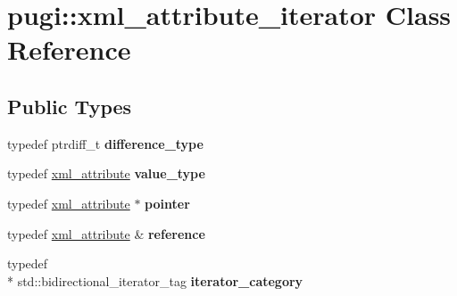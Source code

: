 \hypertarget{classpugi_1_1xml__attribute__iterator}{\section{pugi\+:\+:xml\+\_\+attribute\+\_\+iterator Class Reference}
\label{classpugi_1_1xml__attribute__iterator}
}
\subsection*{Public Types}
\begin{DoxyCompactItemize}
\item 
\hypertarget{classpugi_1_1xml__attribute__iterator_a00b3eecf2aba886a673ad2319be88618}{typedef ptrdiff\+\_\+t {\bfseries difference\+\_\+type}}\label{classpugi_1_1xml__attribute__iterator_a00b3eecf2aba886a673ad2319be88618}

\item 
\hypertarget{classpugi_1_1xml__attribute__iterator_a2b0e779f12de813d7a806056ebed8907}{typedef \hyperlink{classpugi_1_1xml__attribute}{xml\+\_\+attribute} {\bfseries value\+\_\+type}}\label{classpugi_1_1xml__attribute__iterator_a2b0e779f12de813d7a806056ebed8907}

\item 
\hypertarget{classpugi_1_1xml__attribute__iterator_a6ed6fb3197abb02ffa848ad6b9b7a1be}{typedef \hyperlink{classpugi_1_1xml__attribute}{xml\+\_\+attribute} $\ast$ {\bfseries pointer}}\label{classpugi_1_1xml__attribute__iterator_a6ed6fb3197abb02ffa848ad6b9b7a1be}

\item 
\hypertarget{classpugi_1_1xml__attribute__iterator_ade97045a1217d0a7897e5f5873297117}{typedef \hyperlink{classpugi_1_1xml__attribute}{xml\+\_\+attribute} \& {\bfseries reference}}\label{classpugi_1_1xml__attribute__iterator_ade97045a1217d0a7897e5f5873297117}

\item 
\hypertarget{classpugi_1_1xml__attribute__iterator_aad988273a3e4cdc5fa3eb879dbdc8d35}{typedef \\*
std\+::bidirectional\+\_\+iterator\+\_\+tag {\bfseries iterator\+\_\+category}}\label{classpugi_1_1xml__attribute__iterator_aad988273a3e4cdc5fa3eb879dbdc8d35}

\end{DoxyCompactItemize}
